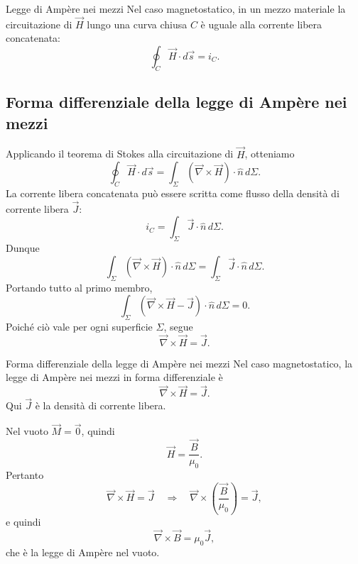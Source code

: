 \documentclass[a4paper]{article}
\begin{document}
\begin{snippettheorem}{Legge di Ampère nei mezzi}
Nel caso magnetostatico, in un mezzo materiale la circuitazione di \(\vec{H}\) lungo una curva chiusa \(C\) è uguale alla corrente libera concatenata:
\[
    \oint_C \vec{H}\cdot d\vec{s}=i_C.
\]
\end{snippettheorem}

\begin{center}
\end{center}

\subsection{Forma differenziale della legge di Ampère nei mezzi}

Applicando il teorema di Stokes alla circuitazione di \(\vec{H}\), otteniamo
\[
\oint_C \vec{H}\cdot d\vec{s}
=\int_\Sigma \left(\vec{\nabla}\times\vec{H}\right)\cdot\hat{n}\,d\Sigma.
\]
La corrente libera concatenata può essere scritta come flusso della densità di corrente libera \(\vec{J}\):
\[
i_C=\int_\Sigma \vec{J}\cdot\hat{n}\,d\Sigma.
\]
Dunque
\[
\int_\Sigma \left(\vec{\nabla}\times\vec{H}\right)\cdot\hat{n}\,d\Sigma
=\int_\Sigma \vec{J}\cdot\hat{n}\,d\Sigma.
\]
Portando tutto al primo membro,
\[
\int_\Sigma \left(\vec{\nabla}\times\vec{H}-\vec{J}\right)\cdot\hat{n}\,d\Sigma=0.
\]
Poiché ciò vale per ogni superficie \(\Sigma\), segue
\[
\vec{\nabla}\times\vec{H}=\vec{J}.
\]

\begin{snippettheorem}{Forma differenziale della legge di Ampère nei mezzi}
Nel caso magnetostatico, la legge di Ampère nei mezzi in forma differenziale è
\[
    \vec{\nabla}\times\vec{H}=\vec{J}.
\]
Qui \(\vec{J}\) è la densità di corrente libera.
\end{snippettheorem}

Nel vuoto \(\vec{M}=\vec{0}\), quindi
\[
\vec{H}=\frac{\vec{B}}{\mu_0}.
\]
Pertanto
\[
\vec{\nabla}\times\vec{H}=\vec{J}
\quad\Longrightarrow\quad
\vec{\nabla}\times\left(\frac{\vec{B}}{\mu_0}\right)=\vec{J},
\]
e quindi
\[
\vec{\nabla}\times\vec{B}=\mu_0\vec{J},
\]
che è la legge di Ampère nel vuoto.
\end{document}
